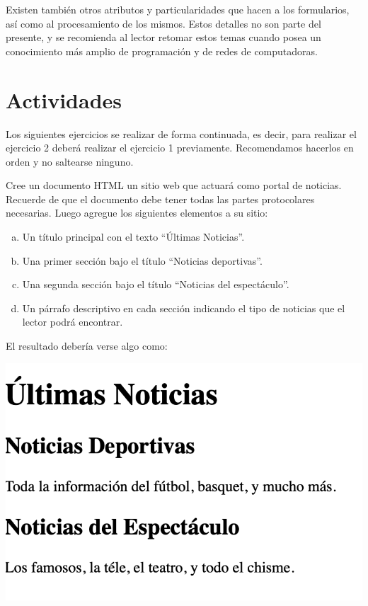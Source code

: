 Existen también otros atributos y particularidades que hacen a los formularios,
así como al procesamiento de los mismos. Estos detalles no son parte del presente,
y se recomienda al lector retomar estos temas cuando posea un conocimiento más
amplio de programación y de redes de computadoras.

\section{Actividades}

Los siguientes ejercicios se realizar de forma continuada, es decir, para
realizar el ejercicio 2 deberá realizar el ejercicio 1 previamente. Recomendamos
hacerlos en orden y no saltearse ninguno.

\begin{exercise}
Cree un documento HTML un sitio web que actuará como portal de noticias.
Recuerde de que el documento debe tener todas las partes protocolares
necesarias. Luego agregue los siguientes elementos a su sitio:
\begin{enumerate}[a)]
  \item Un título principal con el texto ``Últimas Noticias''.
  \item Una primer sección bajo el título ``Noticias deportivas''.
  \item Una segunda sección bajo el título ``Noticias del espectáculo''.
  \item Un párrafo descriptivo en cada sección indicando el tipo de noticias que
    el lector podrá encontrar.
\end{enumerate}

El resultado debería verse algo como:

\includegraphics[scale=0.5]{anexos/1_lenguajes_marcado/2_html/imagenes/diario_1.png}
\end{exercise}


